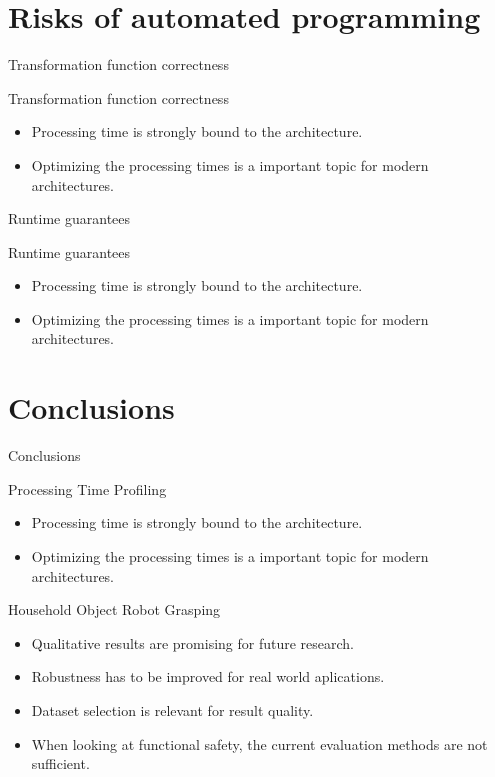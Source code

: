 \documentclass[18pt]{beamer}
\begin{document}
\section{Risks of automated programming}

\begin{frame}{Transformation function correctness}

\begin{block}{Transformation function correctness}
	\begin{itemize}
		\item Processing time is strongly bound to the architecture.
		\item Optimizing the processing times is a important topic for modern architectures.
	\end{itemize}
\end{block}
\end{frame}

\begin{frame}{Runtime guarantees}

\begin{block}{Runtime guarantees}
	\begin{itemize}
		\item Processing time is strongly bound to the architecture.
		\item Optimizing the processing times is a important topic for modern architectures.
	\end{itemize}
\end{block}
\end{frame}

\section{Conclusions}
\begin{frame}{Conclusions}

\begin{block}{Processing Time Profiling}
	\begin{itemize}
		\item Processing time is strongly bound to the architecture.
		\item Optimizing the processing times is a important topic for modern architectures.
	\end{itemize}
\end{block}
\pause
\begin{block}{Household Object Robot Grasping}
    \begin{itemize}
        \item Qualitative results are promising for future research.
        \item Robustness has to be improved for real world aplications.
        \item Dataset selection is relevant for result quality.
        \item When looking at functional safety, the current evaluation methods are not sufficient.
    \end{itemize}
\end{block}
\end{frame}
\end{document}
